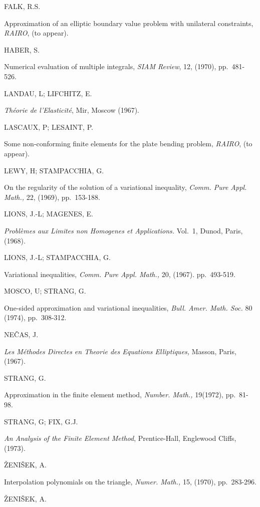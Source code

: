 \begin{thebibliography}{99}
 FALK, R.S.\pageoriginale

Approximation of an elliptic boundary value problem with unilateral
constraints, {\em RAIRO}, (to appear).

 HABER, S.

Numerical evaluation of multiple integrals, {\em SIAM Review}, 12,
(1970), pp.~481-526.

 LANDAU, L; LIFCHITZ, E.

{\em Th\'eorie de l'Elasticit\'e}, Mir, Moscow (1967).

 LASCAUX, P; LESAINT, P.

Some non-conforming finite elements for the plate bending problem,
{\em RAIRO}, (to appear).

 LEWY, H; STAMPACCHIA, G.

On the regularity of the solution of a variational inequality, {\em
  Comm. Pure Appl. Math.,} 22, (1969), pp.~153-188.

 LIONS, J.-L; MAGENES, E.

{\em Probl\`emes aux Limites non Homogenes et Applications.} Vol.~1,
Dunod, Paris, (1968).

 LIONS, J.-L; STAMPACCHIA, G.

Variational inequalities, {\em Comm. Pure Appl. Math.,} 20,
(1967). pp.~493-519. 

 MOSCO, U; STRANG, G.

One-sided approximation and variational inequalities, {\em
  Bull. Amer. Math. Soc.} 80 (1974), pp.~308-312.

 NE\v{C}AS, J.

{\em Les M\'ethodes Directes en Theorie des Equations Elliptiques,}
Masson, Paris, (1967).

 STRANG, G.

Approximation in the finite element method, {\em Number. Math.,}
19(1972), pp.~81-98.

 STRANG, G; FIX, G.J.

{\em An Analysis of the Finite Element Method}, Prentice-Hall,
Englewood Cliffs, (1973).

 \v{Z}ENI\v{S}EK, A.

Interpolation polynomials on the triangle, {\em Numer. Math.,} 15,
(1970), pp.~283-296.

 \v{Z}ENI\v{S}EK, A.


\end{thebibliography}
